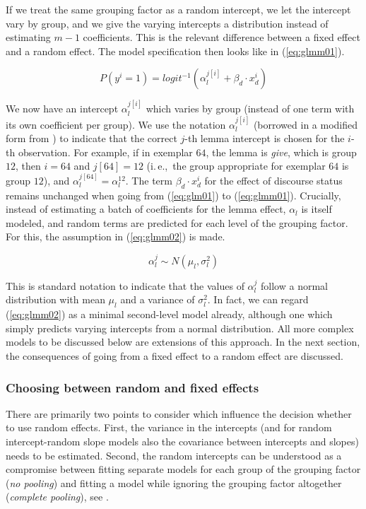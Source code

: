 \documentclass[a4paper,12pt]{article}
\newcommand{\ie}{i.\,e.,\ }
\begin{document}
If we treat the same grouping factor as a random intercept, we let the intercept vary by group, and we give the varying intercepts a distribution instead of estimating $m-1$ coefficients.
This is the relevant difference between a fixed effect and a random effect.
The model specification then looks like in (\ref{eq:glmm01}).

\begin{equation}
  P(y^i=1)=logit^{-1}(\alpha_{l}^{j[i]}+\beta_d\cdot x_d^i)
  \label{eq:glmm01}
\end{equation}

We now have an intercept $\alpha_l^{j[i]}$ which varies by group (instead of one term with its own coefficient per group).
We use the notation $\alpha_l^{j[i]}$ (borrowed in a modified form from \citealt{GelmanHill2006}) to indicate that the correct $j$-th lemma intercept is chosen for the $i$-th observation.
For example, if in exemplar $64$, the lemma is \textit{give}, which is group $12$, then $i=64$ and $j[64]=12$ (\ie the group appropriate for exemplar $64$ is group $12$), and $\alpha_l^{j[64]}=\alpha_l^{12}$.
The term $\beta_d\cdot x_d^i$ for the effect of discourse status remains unchanged when going from (\ref{eq:glm01}) to (\ref{eq:glmm01}).
Crucially, instead of estimating a batch of coefficients for the lemma effect, $\alpha_l$ is itself modeled, and random terms are predicted for each level of the grouping factor.
For this, the assumption in (\ref{eq:glmm02}) is made.

\begin{equation}
  \alpha_l^j\sim N(\mu_l,\sigma_l^2)
  \label{eq:glmm02}
\end{equation}

This is standard notation to indicate that the values of $\alpha_l^j$ follow a normal distribution with mean $\mu_l$ and a variance of $\sigma_l^2$.
In fact, we can regard (\ref{eq:glmm02}) as a minimal second-level model already, although one which simply predicts varying intercepts from a normal distribution.
All more complex models to be discussed below are extensions of this approach.
In the next section, the consequences of going from a fixed effect to a random effect are discussed.

\subsubsection{Choosing between random and fixed effects}
\label{sec:choosingbetweenrandomandfixedeffects}

There are primarily two points to consider which influence the decision whether to use random effects.
First, the variance in the intercepts (and for random intercept-random slope models also the covariance between intercepts and slopes) needs to be estimated.
Second, the random intercepts can be understood as a compromise between fitting separate models for each group of the grouping factor (\textit{no pooling}) and fitting a model while ignoring the grouping factor altogether (\textit{complete pooling}), see \citet[Ch.~12]{GelmanHill2006}.
\end{document}
